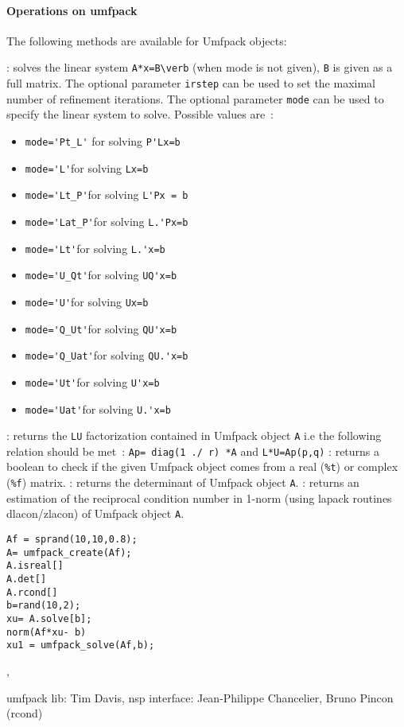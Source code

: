 \paragraph{Operations on umfpack}
The following methods are available for Umfpack objects:
\begin{varlist}
  : solves the linear system \verb+A*x=B\verb+ (when mode is not given), \verb+B+ is given as a full 
   matrix. The optional parameter \verb+irstep+ can be used to set the maximal number of refinement iterations.
   The optional parameter \verb+mode+ can be used to specify the linear system to solve. Possible values are~:
     \begin{itemize} 
        \item \verb+mode='Pt_L'+ for solving \verb+P'Lx=b+
        \item \verb+mode='L'+for solving \verb+Lx=b+
        \item \verb+mode='Lt_P'+for solving \verb+L'Px = b+
        \item \verb+mode='Lat_P'+for solving \verb+L.'Px=b+
        \item \verb+mode='Lt'+for solving \verb+L.'x=b+
        \item \verb+mode='U_Qt'+for solving \verb+UQ'x=b+
        \item \verb+mode='U'+for solving \verb+Ux=b+
        \item \verb+mode='Q_Ut'+for solving \verb+QU'x=b+
        \item \verb+mode='Q_Uat'+for solving \verb+QU.'x=b+
        \item \verb+mode='Ut'+for solving \verb+U'x=b+
        \item \verb+mode='Uat'+for solving \verb+U.'x=b+
     \end{itemize}
  : returns the \verb+LU+ factorization contained in Umfpack object \verb+A+ i.e the following relation should be met~: \verb+Ap= diag(1 ./ r) *A+ and 
  \verb+L*U=Ap(p,q)+ 
  : returns a boolean to check if the given Umfpack object comes from a real 
  (\verb+%t+) or complex (\verb+%f+) matrix. 
  : returns the determinant of Umfpack object \verb+A+.
  : returns an estimation of the reciprocal condition
  number in 1-norm (using lapack routines dlacon/zlacon) of Umfpack object \verb+A+.
  \end{varlist}

\begin{examples}
\begin{Verbatim}
Af = sprand(10,10,0.8);
A= umfpack_create(Af);
A.isreal[]
A.det[] 
A.rcond[] 
b=rand(10,2); 
xu= A.solve[b]; 
norm(Af*xu- b) 
xu1 = umfpack_solve(Af,b);
\end{Verbatim}
\end{examples}

\begin{manseealso}
, 
\end{manseealso}


\begin{authors}
   umfpack lib: Tim Davis, nsp interface: Jean-Philippe Chancelier,
   Bruno Pincon (rcond)
\end{authors}
